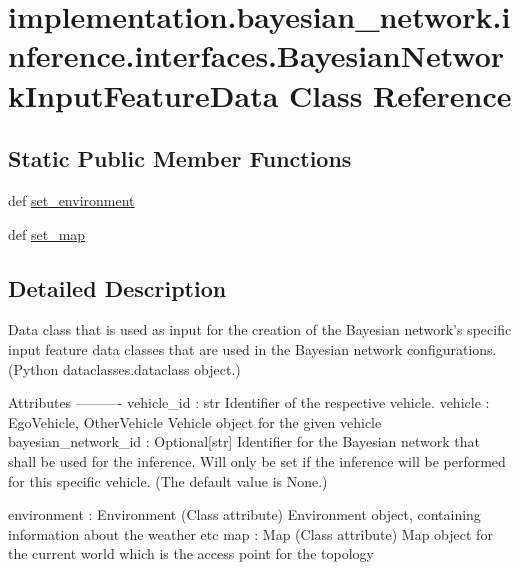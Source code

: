 \hypertarget{classimplementation_1_1bayesian__network_1_1inference_1_1interfaces_1_1_bayesian_network_input_feature_data}{}\section{implementation.\+bayesian\+\_\+network.\+inference.\+interfaces.\+Bayesian\+Network\+Input\+Feature\+Data Class Reference}
\label{classimplementation_1_1bayesian__network_1_1inference_1_1interfaces_1_1_bayesian_network_input_feature_data}
\subsection*{Static Public Member Functions}
\begin{DoxyCompactItemize}
\item 
def \hyperlink{classimplementation_1_1bayesian__network_1_1inference_1_1interfaces_1_1_bayesian_network_input_feature_data_a23717b9e24d7048b1af3425c7e824432}{set\+\_\+environment}
\item 
def \hyperlink{classimplementation_1_1bayesian__network_1_1inference_1_1interfaces_1_1_bayesian_network_input_feature_data_a159d5e2bf1018e48846f577c7cab8b67}{set\+\_\+map}
\end{DoxyCompactItemize}


\subsection{Detailed Description}
\begin{DoxyVerb}Data class that is used as input for the creation of the Bayesian network's specific input feature data classes
that are used in the Bayesian network configurations.
(Python dataclasses.dataclass object.)

Attributes
----------
vehicle_id : str
    Identifier of the respective vehicle.
vehicle : EgoVehicle,  OtherVehicle
    Vehicle object for the given vehicle
bayesian_network_id : Optional[str]
    Identifier for the Bayesian network that shall be used for the inference. Will only be set if the inference
    will be performed for this specific vehicle. (The default value is None.)

environment : Environment
    (Class attribute) Environment object, containing information about the weather etc
map : Map
    (Class attribute) Map object for the current world which is the access point for the topology
\end{DoxyVerb}
 

